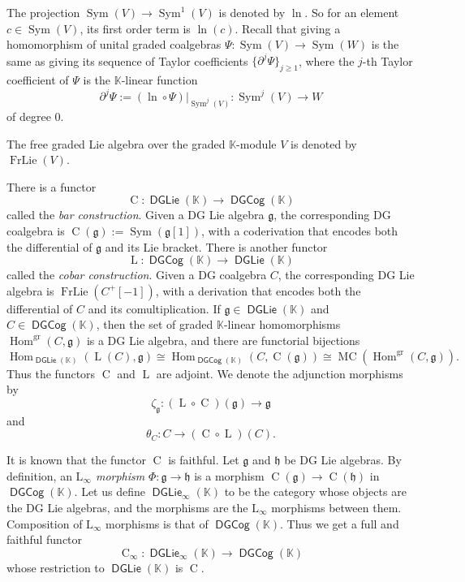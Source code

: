 \documentclass[a4paper,10pt]{amsart}
\theoremstyle{definition}
\numberwithin{equation}{section}
\newcommand{\opn}{\operatorname}
\newcommand{\cat}[1]{\operatorname{\mathsf{#1}}}
\newcommand{\mfrak}[1]{\mathfrak{#1}}
\newcommand{\mrm}[1]{\mathrm{#1}}
\newcommand{\mbb}[1]{\mathbb{#1}}
\newcommand{\K}{\mbb{K}}
\newcommand{\g}{\mfrak{g}}
\newcommand{\h}{\mfrak{h}}
\renewcommand{\th}{\theta}
\newcommand{\pa}{\partial}
\newcommand{\lb}{\linebreak}
\begin{document}
The projection $\opn{Sym}(V) \to \opn{Sym}^1(V)$ is denoted by $\ln$.
So for an element $c \in \opn{Sym}(V)$, its first order term is $\ln(c)$.
Recall that giving a homomorphism of unital graded coalgebras
$\Psi : \opn{Sym}(V) \to \opn{Sym}(W)$ 
is the same as giving its sequence of Taylor coefficients 
$\{ \pa^j\Psi \}_{j \geq 1}$,
where the $j$-th Taylor coefficient of $\Psi$ is the $\K$-linear function 
\[ \partial^j \Psi := (\ln \circ \Psi)|_{\opn{Sym}^j(V)} : 
\opn{Sym}^j(V) \to W  \]
of degree $0$.

The free graded Lie algebra over the graded $\K$-module $V$ is denoted by \lb
$\opn{FrLie}(V)$. 

There is a functor 
\[ \opn{C} : \cat{DGLie}(\K) \to \cat{DGCog}(\K) \]
called the {\em bar construction}. Given a DG Lie algebra $\g$, the
corresponding DG coalgebra is 
$\opn{C}(\g) := \opn{Sym}(\g[1])$, with a coderivation that encodes both the
differential of $\g$ and its Lie bracket. 
There is another functor 
\[ \opn{L} : \cat{DGCog}(\K) \to \cat{DGLie}(\K)   \]
called the {\em cobar construction}. Given a DG coalgebra $C$, the
corresponding DG Lie algebra is $\opn{FrLie}(C^+[-1])$, with a derivation that
encodes both the differential of $C$ and its comultiplication. 
If $\g \in \cat{DGLie}(\K)$ and $C \in \cat{DGCog}(\K)$, then the set of graded
$\K$-linear homomorphisms $\opn{Hom}^{\mrm{gr}}(C, \g)$ 
is a DG Lie algebra, and there are functorial bijections
\begin{equation} \label{eqn:60}
\opn{Hom}_{\cat{DGLie}(\K)}(\opn{L}(C), \g) \cong
\opn{Hom}_{\cat{DGCog}(\K)}(C, \opn{C}(\g)) \cong
\opn{MC}(\opn{Hom}^{\mrm{gr}}(C, \g)) . 
\end{equation}
Thus the functors $\opn{C}$ and $\opn{L}$ are adjoint.
We denote the adjunction morphisms by
\[ \zeta_{\g} : (\opn{L} \circ \opn{C})(\g) \to \g \]
and 
\[ \th_C : C \to (\opn{C} \circ \opn{L})(C) .  \]

It is known that the functor $\opn{C}$ is faithful. 
Let $\g$ and $\h$ be DG Lie algebras.
By definition, an {\em $\mrm{L}_{\infty}$ morphism} $\Phi : \g \to \h$ 
is a morphism $\opn{C}(\g) \to \opn{C}(\h)$ in $\cat{DGCog}(\K)$.
Let us define $\cat{DGLie}_{\infty}(\K)$ to be the category whose objects are
the DG Lie algebras, and the morphisms are the  $\mrm{L}_{\infty}$ morphisms
between them. Composition of  $\mrm{L}_{\infty}$ morphisms is that of
$\cat{DGCog}(\K)$. Thus we get a full and faithful functor
\[ \opn{C}_{\infty} : \cat{DGLie}_{\infty}(\K) \to \cat{DGCog}(\K) \]
whose restriction to $\cat{DGLie}(\K)$ is $\opn{C}$.
\end{document}

